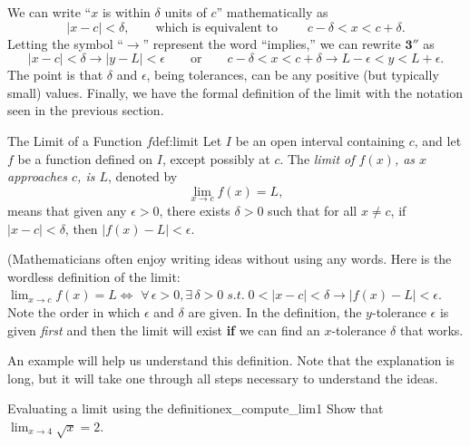 We can write ``$x$ is within $\delta$ units of $c$'' mathematically as
$$|x-c| < \delta, \qquad \text{which is equivalent to }\qquad c-\delta < x < c+\delta.$$
Letting the symbol ``$\longrightarrow$'' represent the word ``implies,'' we can rewrite $\textbf{3}''$ as 
$$
|x - c| < \delta \longrightarrow  |y - L| < \epsilon 
\qquad \textrm{or} \qquad c - \delta < x < c + \delta \longrightarrow L - \epsilon < y < L + \epsilon.
$$
The point is that $\delta$ and $\epsilon$, being tolerances, can be any positive (but typically small) values.  Finally, we have the formal definition of the limit with the notation  seen in the previous section.



\begin{definition}{The Limit of a Function $f$}{def:limit}
{Let $I$ be an open interval containing $c$, and let $f$ be a function defined on $I$, except possibly at $c$. The \textit{limit of $f(x)$, as $x$ approaches $c$, is $L$}, denoted by  
$$\displaystyle \lim_{x\rightarrow c} f(x) = L,$$
means that given any $\epsilon > 0$, there exists $\delta > 0$ such that for all $x\neq c$,  
if  $|x - c| < \delta$, then $|f(x) - L| < \epsilon$.
}
\end{definition}


(Mathematicians often enjoy writing ideas without using any words. Here is the wordless definition of the limit:\\

$\displaystyle \lim_{x\rightarrow c} f(x) = L \iff$
$\forall \, \epsilon > 0, \exists \, \delta > 0 \; s.t. \;
0<|x - c| < \delta \longrightarrow |f(x) - L| < \epsilon$.\text{)}\\

Note the order in which $\epsilon$ and $\delta$ are given.  In the definition, the $y$-tolerance $\epsilon$ is given \textit{first} and then the limit will exist {\bf if} we can find an $x$-tolerance $\delta$ that works.  

An example will help us understand this definition.  Note that the explanation is long, but it will take one through all steps necessary to understand the ideas.\\


\begin{example}{Evaluating a limit using the definition}{ex_compute_lim1}{
Show that $\displaystyle \lim_{x\rightarrow 4} \sqrt{x} = 2 $.}
\end{example}


